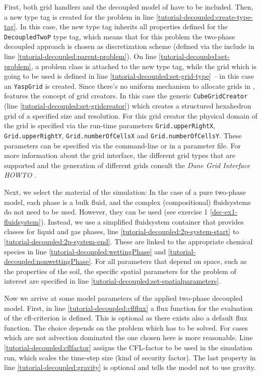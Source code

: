 First, both \Dune  grid handlers and the decoupled model of \Dumux 
have to be included. Then, a new type tag is created for the problem 
in line \ref{tutorial-decoupled:create-type-tag}.  In this case, the 
new type tag inherits all properties defined for the \texttt{DecoupledTwoP} 
type tag, which means that for this problem the two-phase decoupled approach
is chosen as discretization scheme (defined via the include in line 
\ref{tutorial-decoupled:parent-problem}). On line \ref{tutorial-decoupled:set-problem}, 
a problem class is attached to the new type tag, while the grid which
is going to be used is defined in line \ref{tutorial-decoupled:set-grid-type} --
in this case an \texttt{YaspGrid} is created. Since there's no uniform mechanism to
allocate grids in \Dune, \Dumux features the concept of grid creators.
In this case the generic \texttt{CubeGridCreator} (line \ref{tutorial-decoupled:set-gridcreator}) which creates a
structured hexahedron grid of a specified size and resolution. For
this grid creator the  physical domain of the grid is specified via the
run-time parameters \texttt{Grid.upperRightX},
\texttt{Grid.upperRightY}, \texttt{Grid.numberOfCellsX} and
\texttt{Grid.numberOfCellsY}. These parameters can be specified via
the command-line or in a parameter file.
For more information about the \Dune grid interface, the different grid types 
that are supported and the generation of different grids consult 
the \textit{Dune Grid Interface HOWTO} \cite{DUNE-HP}. 

Next, we select the material of the simulation: In the case of a pure two-phase
model, each phase is a bulk fluid, and the complex (compositional) fluidsystems
do not need to be used. However, they can be used (see exercise 1 \ref{dec-ex1-fluidsystem}). 
Instead, we use a simplified fluidsystem container that provides classes 
for liquid and gas phases, line \ref{tutorial-decoupled:2p-system-start} to 
\ref{tutorial-decoupled:2p-system-end}. These are linked to the appropriate 
chemical species in line \ref{tutorial-decoupled:wettingPhase} and 
\ref{tutorial-decoupled:nonwettingPhase}. For all parameters that depend 
on space, such as the properties of the soil, the specific spatial parameters 
for the problem of interest are specified in line
\ref{tutorial-decoupled:set-spatialparameters}. 

Now we arrive at some model parameters of the applied two-phase decoupled 
model. First, in line  \ref{tutorial-decoupled:cflflux} a flux function for the evaluation of the cfl-criterion is defined. This is optional as there exists also a default flux function. The choice depends on the problem which has to be solved. For cases which are not advection dominated the one chosen here is more reasonable.
Line \ref{tutorial-decoupled:cflfactor} assigns the CFL-factor to be used in the
simulation run, which scales the time-step size (kind of security factor). The last property in line \ref{tutorial-decoupled:gravity} 
is optional and tells the model not to use gravity.

